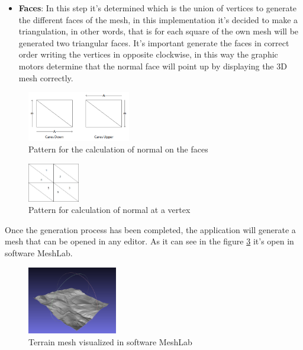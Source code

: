 \documentclass[10pt,a4paper,twocolumn,twoside]{article}
\begin{document}
\begin{itemize}
  \item \textbf{Faces}: In this step it's determined which is the union of vertices to generate the different faces of the mesh, in this implementation it's decided to make a triangulation, in other words, that is for each square of the own mesh will be generated two triangular faces. It's important generate the faces in correct order writing the vertices in opposite clockwise, in this way the graphic motors determine that the normal face will point up by displaying the 3D mesh correctly.
\end{itemize}

\begin{figure}[!h]
\centering
  	\includegraphics[width=0.4\textwidth]{caranormal}
	\caption{Pattern for the calculation of normal on the faces}
	\label{fig-normalcara}
\end{figure}

\begin{figure}[!h]
\centering
  	\includegraphics[width=0.2\textwidth]{vertexnormal}
	\caption{Pattern for calculation of normal at a vertex}
	\label{fig-normalvertex}
\end{figure}

Once the generation process has been completed, the application will generate a mesh that can be opened in any editor. As it can see in the figure \ref{fig-meshlab} it's open in software MeshLab.

\begin{figure}[!h]
\centering
  	\includegraphics[width=0.35\textwidth]{mesh_example_meshlab}
	\caption{Terrain mesh visualized in software MeshLab}
	\label{fig-meshlab}
\end{figure}
\end{document}
